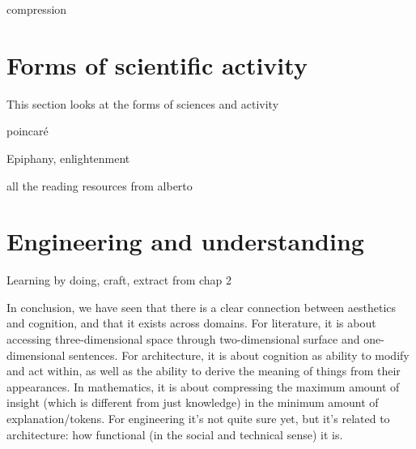 compression

\section{Forms of scientific activity}
\label{sec:aesthetic-mathematics}

This section looks at the forms of sciences and activity



poincaré

Epiphany, enlightenment

all the reading resources from alberto


\section{Engineering and understanding}
\label{sec:aesthetic-engineering}


Learning by doing, craft, extract from chap 2

\spacer

In conclusion, we have seen that there is a clear connection between aesthetics and cognition, and that it exists across domains. For literature, it is about accessing three-dimensional space through two-dimensional surface and one-dimensional sentences. For architecture, it is about cognition as ability to modify and act within, as well as the ability to derive the meaning of things from their appearances. In mathematics, it is about compressing the maximum amount of insight (which is different from just knowledge) in the minimum amount of explanation/tokens. For engineering it's not quite sure yet, but it's related to architecture: how functional (in the social and technical sense) it is.